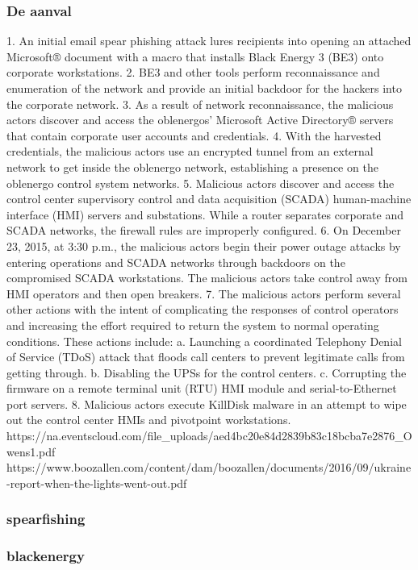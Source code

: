 \subsubsection{De aanval}
1. An initial email spear phishing attack lures recipients
into opening an attached Microsoft® document with a
macro that installs Black Energy 3 (BE3) onto
corporate workstations.
2. BE3 and other tools perform reconnaissance and
enumeration of the network and provide an initial
backdoor for the hackers into the corporate network.
3. As a result of network reconnaissance, the malicious
actors discover and access the oblenergos’ Microsoft
Active Directory® servers that contain corporate user
accounts and credentials.
4. With the harvested credentials, the malicious actors use
an encrypted tunnel from an external network to get
inside the oblenergo network, establishing a presence
on the oblenergo control system networks.
5. Malicious actors discover and access the control center
supervisory control and data acquisition (SCADA)
human-machine interface (HMI) servers and
substations. While a router separates corporate and
SCADA networks, the firewall rules are improperly
configured.
6. On December 23, 2015, at 3:30 p.m., the malicious
actors begin their power outage attacks by entering
operations and SCADA networks through backdoors on
the compromised SCADA workstations. The malicious
actors take control away from HMI operators and then
open breakers.
7. The malicious actors perform several other actions with
the intent of complicating the responses of control
operators and increasing the effort required to return the
system to normal operating conditions. These actions
include:
a. Launching a coordinated Telephony Denial of
Service (TDoS) attack that floods call centers to
prevent legitimate calls from getting through.
b. Disabling the UPSs for the control centers.
c. Corrupting the firmware on a remote terminal unit
(RTU) HMI module and serial-to-Ethernet port
servers.
8. Malicious actors execute KillDisk malware in an
attempt to wipe out the control center HMIs and pivotpoint workstations.
https://na.eventscloud.com/file_uploads/aed4bc20e84d2839b83c18bcba7e2876_Owens1.pdf
\cite{Whitehead2017ukrainepoweroutage}
https://www.boozallen.com/content/dam/boozallen/documents/2016/09/ukraine-report-when-the-lights-went-out.pdf
\cite{boozallen2016lightwentout}
\subsubsection{spearfishing}
\subsubsection{blackenergy}
